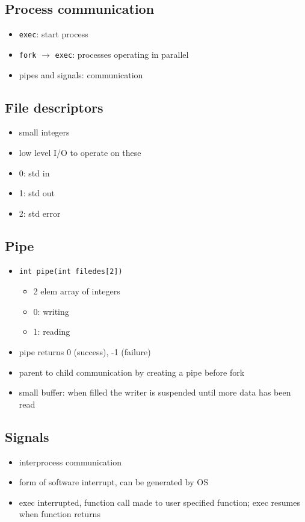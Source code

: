 \documentclass[10pt, multicolumn, a4paper]{article}
\begin{document}
\begin{multicols}{2}
	\subsection*{Process communication}
	\begin{itemize}
	\item \verb|exec|: start process
	\item \verb|fork| $\rightarrow$ \verb|exec|: processes operating in parallel
	\item pipes and signals: communication
	\end{itemize}
	\subsection*{File descriptors}
	\begin{itemize}
	\item small integers
	\item low level I/O to operate on these
	\item 0: std in
	\item 1: std out
	\item 2: std error
	\end{itemize}
	\subsection*{Pipe}
	\begin{itemize}
	\item \verb|int pipe(int filedes[2])|
		\begin{itemize}
		\item 2 elem array of integers
		\item 0: writing
		\item 1: reading
		\end{itemize}
	\item pipe returns 0 (success), -1 (failure)
	\item parent to child communication by creating a pipe before fork
	\item small buffer: when filled the writer is suspended until more data has been read
	\end{itemize}
	\subsection*{Signals}
	\begin{itemize}
	\item interprocess communication
	\item form of software interrupt, can be generated by OS
	\item exec interrupted, function call made to user specified function; exec resumes when function returns
	\end{itemize}

\end{multicols}
\end{document}
